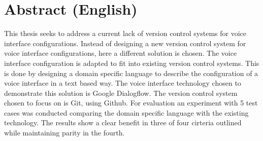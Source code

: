 \chapter*{Abstract (English)}

This thesis seeks to address a current lack of version control systems for voice interface configurations. Instead of designing a new version control system for voice interface configurations, here a different solution is chosen. The voice interface configuration is adapted to fit into existing version control systems.
This is done by designing a domain specific language to describe the configuration of a voice interface in a text based way.
The voice interface technology chosen to demonstrate this solution is Google Dialogflow. The version control system chosen to focus on is Git, using Github.
For evaluation an experiment with 5 test cases was conducted comparing the domain specific language with the existing technology.
The results show a clear benefit in three of four cirteria outlined while maintaining parity in the fourth.